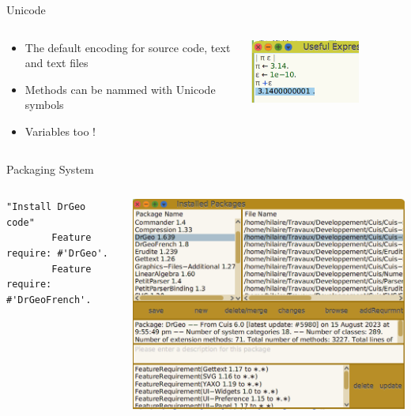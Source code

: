 \documentclass{beamer}
\begin{document}
\begin{frame}{Unicode}
  \begin{columns}[c]
    \begin{column}{0.5\textwidth}
      \begin{itemize}
      \item The default encoding for source code, text and text files
      \item Methods can be nammed with Unicode symbols
      \item Variables too !
      \end{itemize}
    \end{column}
    \begin{column}{0.5\textwidth}
      \includegraphics[width=0.7\textwidth]{unicodeInCode.png}      
    \end{column}
  \end{columns}
\end{frame}
%
\begin{frame}[fragile]{Packaging System}
  \begin{columns}[c]
    \begin{column}{0.5\textwidth}
      \fontsize{8pt}{0pt}\selectfont
      \begin{lstlisting}[language=Smalltalk]
        "Install DrGeo code"
        Feature require: #'DrGeo'.
        Feature require: #'DrGeoFrench'.
      \end{lstlisting}      
    \end{column}
    \begin{column}{0.5\textwidth}
      \includegraphics[width=\textwidth]{codePackager.png}       
    \end{column}
  \end{columns}
\end{frame}
\end{document}
